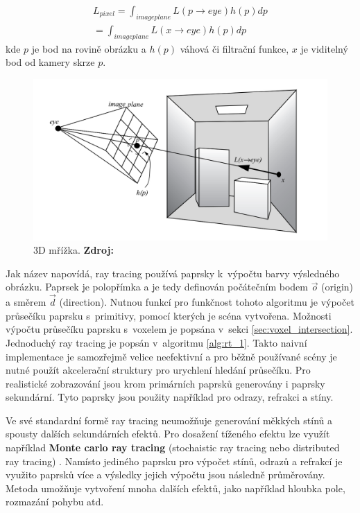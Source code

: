 \begin{equation} \label{eq:rt_1}
	\begin{gathered}
		L_{pixel} = \int_{imageplane}L(p \xrightarrow{} eye)h(p)dp \\= \int_{imageplane}L(x \xrightarrow{} eye)h(p)dp
	\end{gathered}
\end{equation}
kde $p$ je bod na rovině obrázku a $h(p)$ váhová či filtrační funkce, $x$ je viditelný bod od kamery skrze $p$.

\begin{figure}[H]
	\centering
	\includegraphics[scale=1]{obrazky-figures/ray_tracing_plane.png}
	\caption{3D mřížka. \textbf{Zdroj: \cite{advanced_global}}}
	\label{fig:3d_grid}
\end{figure}


Jak název napovídá, ray tracing používá paprsky k~výpočtu barvy výsledného obrázku. Paprsek je polopřímka a je tedy definován počátečním bodem $\Vec{o}$ (origin) a směrem $\Vec{d}$ (direction). Nutnou funkcí pro funkčnost tohoto algoritmu je výpočet průsečíku paprsku s~primitivy, pomocí kterých je scéna vytvořena. Možnosti výpočtu průsečíku paprsku s~voxelem je popsána v~sekci \ref{sec:voxel_intersection}. Jednoduchý ray tracing je popsán v~algoritmu \ref{alg:rt_1}. Takto naivní implementace je samozřejmě velice neefektivní a pro běžně používané scény je nutné použít akcelerační struktury pro urychlení hledání průsečíku\cite{accelerated_rt}. Pro realistické zobrazování jsou krom primárních paprsků generovány i paprsky sekundární. Tyto paprsky jsou použity například pro odrazy, refrakci a stíny.

Ve své standardní formě ray tracing neumožňuje generování měkkých stínů a spousty dalších sekundárních efektů.  Pro dosažení tíženého efektu lze využít například \textbf{Monte carlo ray tracing} (stochaistic ray tracing nebo distributed ray tracing) \cite{distributed_rt}. Namísto jediného paprsku pro výpočet stínů, odrazů a refrakcí je využito paprsků více a výsledky jejich výpočtu jsou následně průměrovány. Metoda umožňuje vytvoření mnoha dalších efektů, jako například hloubka pole, rozmazání pohybu atd.

